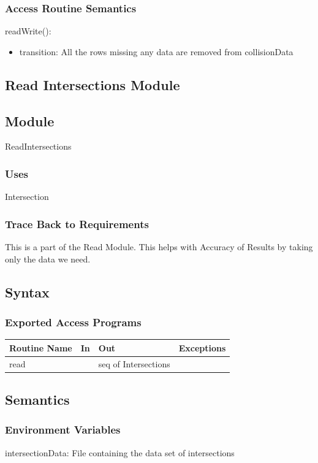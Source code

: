 \documentclass[12pt]{article}
\begin{document}
\subsubsection*{Access Routine Semantics}

readWrite():
\begin{itemize}
    \item transition: All the rows missing any data are removed from collisionData
\end{itemize}

\newpage
\subsection{Read Intersections Module}
\subsection*{Module}
ReadIntersections

\subsubsection*{Uses}
Intersection

\subsubsection*{Trace Back to Requirements}
This is a part of the Read Module. This helps with Accuracy of Results by taking only the data we need.

\subsection*{Syntax}
\subsubsection*{Exported Access Programs}
    \begin{tabular}{|l|l|l|l|}
    \hline
    \textbf{Routine Name} & \textbf{In} & \textbf{Out} & \textbf{Exceptions}\\
    \hline
    read & ~ & seq of Intersections & ~\\
    \hline
    \end{tabular}
    
\subsection*{Semantics}
\subsubsection*{Environment Variables}
intersectionData: File containing the data set of intersections
\end{document}
